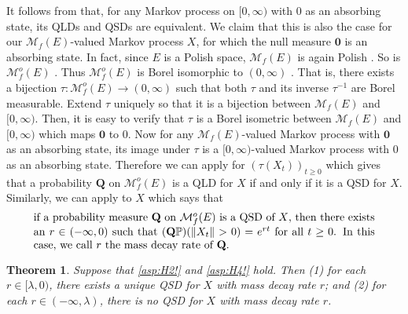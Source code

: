 \documentclass[12pt,a4paper]{amsart}
\numberwithin{equation}{section}
\theoremstyle{plain}
\newtheorem{thm}{Theorem}[section]
\theoremstyle{definition}
\theoremstyle{remark}
\begin{document}
	It follows from \cite[Proposition 1]{MeleardVillemonais2012Quasi-stationary} that, for any Markov process on $[0,\infty)$ with $0$ as an absorbing state, its QLDs and QSDs are equivalent.
	We claim that this is also the case for our $\mathcal M_f(E)$-valued Markov process $X$, for which the null measure $\mathbf 0$ is an absorbing state.
	In fact, since $E$ is a Polish space, $\mathcal M_f(E)$ is again Polish \cite[Lemma 4.3]{Kallenberg2017Random}.
	So is $\mathcal M^o_f(E)$ \cite[Theorem A1.2]{Kallenberg2002Foundations}.
	Thus $\mathcal M^o_f(E)$ is Borel isomorphic to $(0,\infty)$ \cite[Theorem A.1.6]{Kallenberg2002Foundations}.
	That is, there exists a bijection $\tau: \mathcal M^o_f(E) \to (0,\infty)$ such that both $\tau$ and its inverse $\tau^{-1}$ are Borel measurable.
	Extend $\tau$ uniquely so that it is a bijection between $\mathcal M_f(E)$ and $[0,\infty)$.
	Then, it is easy to verify that $\tau$ is a Borel isometric between $\mathcal M_f(E)$ and $[0,\infty)$ which maps $\mathbf 0$ to $0$. 
	Now for any $\mathcal M_f(E)$-valued Markov process with $\mathbf 0$ as an absorbing state,
	its image under $\tau$ is a $[0,\infty)$-valued Markov process with $0$ as an absorbing state.
	Therefore we can apply \cite[Proposition 1]{MeleardVillemonais2012Quasi-stationary} for $(\tau(X_t))_{t\geq 0}$ which gives that
	a probability $\mathbf Q$ on $\mathcal M^o_f(E)$ is a QLD for $X$ if and only if it is a QSD for $X$.
	Similarly, we can apply \cite[Proposition 2]{MeleardVillemonais2012Quasi-stationary} to $X$ which says that
\begin{equation} \label{eq:S.2}
\begin{minipage}{0.9\textwidth}
	if a probability measure $\mathbf Q$ on $\mathcal M^o_f(E)$ is a QSD of $X$, then there exists an $r\in (-\infty,0)$ such that $(\mathbf Q\mathbb P)(\|X_t\|>0) = e^{rt}$ for all $t\geq 0$.
	In this case, we call $r$ the mass decay rate of $\mathbf Q$.
\end{minipage}
\end{equation}
	
\begin{thm} \label{thm:QSD}
	Suppose that \eqref{asp:H2!} and \eqref{asp:H4!} hold.
	Then (1) for each $r \in [\lambda, 0)$, there exists a unique QSD for $X$ with mass decay rate $r$;
	and (2) for each $r\in (-\infty, \lambda)$, there is no QSD for $X$ with mass decay rate $r$.
\end{thm}
\end{document}
